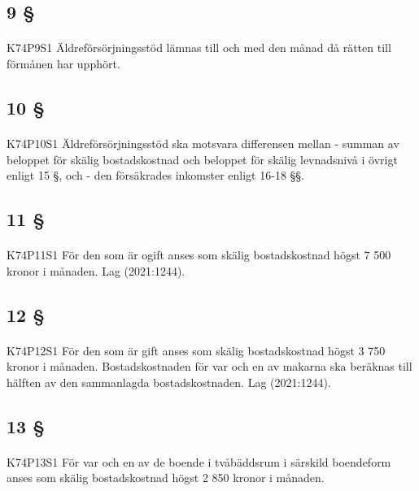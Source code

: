 \documentclass[a4paper,notitlepage,openany,10pt]{book}
\begin{document}
\subsection*{9 §}
\paragraph*{}
{\tiny K74P9S1}
Äldreförsörjningsstöd lämnas till och med den månad då rätten till förmånen har upphört.
\subsection*{10 §}
\paragraph*{}
{\tiny K74P10S1}
Äldreförsörjningsstöd ska motsvara differensen mellan
\newline - summan av beloppet för skälig bostadskostnad och beloppet för skälig levnadsnivå i övrigt enligt 15 §, och
\newline - den försäkrades inkomster enligt 16-18 §§.
\subsection*{11 §}
\paragraph*{}
{\tiny K74P11S1}
För den som är ogift anses som skälig bostadskostnad högst 7 500 kronor i månaden.
Lag (2021:1244).
\subsection*{12 §}
\paragraph*{}
{\tiny K74P12S1}
För den som är gift anses som skälig bostadskostnad högst 3 750 kronor i månaden. Bostadskostnaden för var och en av makarna ska beräknas till hälften av den sammanlagda bostadskostnaden.
Lag (2021:1244).
\subsection*{13 §}
\paragraph*{}
{\tiny K74P13S1}
För var och en av de boende i tvåbäddsrum i särskild boendeform anses som skälig bostadskostnad högst 2 850 kronor i månaden.
\end{document}
